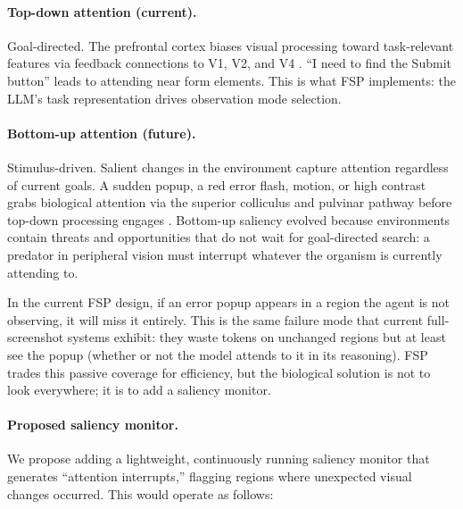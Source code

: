 \documentclass[11pt,a4paper]{article}
\begin{document}
\paragraph{Top-down attention (current).}
Goal-directed. The prefrontal cortex biases visual processing toward task-relevant features via feedback connections to V1, V2, and V4 \cite{desimone-duncan-attention, corbetta2002control}. ``I need to find the Submit button'' leads to attending near form elements. This is what FSP implements: the LLM's task representation drives observation mode selection.

\paragraph{Bottom-up attention (future).}
Stimulus-driven. Salient changes in the environment capture attention regardless of current goals. A sudden popup, a red error flash, motion, or high contrast grabs biological attention via the superior colliculus and pulvinar pathway before top-down processing engages \cite{itti-koch-saliency, theeuwes-capture}. Bottom-up saliency evolved because environments contain threats and opportunities that do not wait for goal-directed search: a predator in peripheral vision must interrupt whatever the organism is currently attending to.

In the current FSP design, if an error popup appears in a region the agent is not observing, it will miss it entirely. This is the same failure mode that current full-screenshot systems exhibit: they waste tokens on unchanged regions but at least see the popup (whether or not the model attends to it in its reasoning). FSP trades this passive coverage for efficiency, but the biological solution is not to look everywhere; it is to add a saliency monitor.

\paragraph{Proposed saliency monitor.}
We propose adding a lightweight, continuously running saliency monitor that generates ``attention interrupts,'' flagging regions where unexpected visual changes occurred. This would operate as follows:
\end{document}
